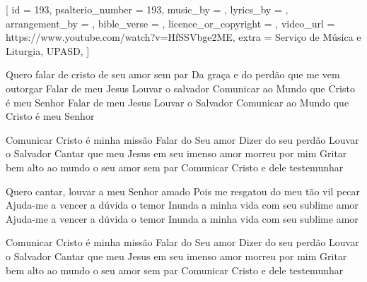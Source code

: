 [
    id                     = {193},
    psalterio_number       = {193},
    music_by               = {},
    lyrics_by              = {},
    arrangement_by         = {},
    bible_verse            = {},
    licence_or_copyright   = {},
    video_url              = {https://www.youtube.com/watch?v=HfSSVbge2ME},
    extra                  = {Serviço de Música e Liturgia, UPASD},
]


\beginverse
Quero falar de cristo de seu amor sem par
Da graça e do perdão que me vem outorgar
Falar de meu Jesus Louvar o salvador
Comunicar ao Mundo que Cristo é meu Senhor
Falar de meu Jesus Louvar o Salvador
Comunicar ao Mundo que Cristo é meu Senhor
\endverse


\beginchorus
Comunicar Cristo é minha missão
Falar do Seu amor
Dizer do seu perdão
Louvar o Salvador
Cantar que meu Jesus em seu imenso amor morreu por mim
Gritar bem alto ao mundo o seu amor sem par
Comunicar Cristo e dele testemunhar
\endchorus




\beginverse
Quero cantar, louvar a meu Senhor amado
Pois me resgatou do meu tão vil pecar
Ajuda-me a vencer a dúvida o temor
Inunda a minha vida com seu sublime amor
Ajuda-me a vencer a dúvida o temor
Inunda a minha vida com seu sublime amor
\endverse


\beginchorus
Comunicar Cristo é minha missão
Falar do Seu amor
Dizer do seu perdão
Louvar o Salvador
Cantar que meu Jesus em seu imenso amor morreu por mim
Gritar bem alto ao mundo o seu amor sem par
Comunicar Cristo e dele testemunhar
\endchorus

\endsong
